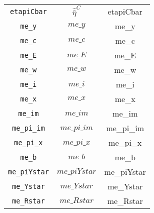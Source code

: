 \begin{center}
\begin{longtable}{ccc}
\texttt{etapiCbar} & $\hat{\bar{\eta}}^C$ & etapiCbar\\
\texttt{me\_y} & $me\_y$ & me\_y\\
\texttt{me\_c} & $me\_c$ & me\_c\\
\texttt{me\_E} & $me\_E$ & me\_E\\
\texttt{me\_w} & $me\_w$ & me\_w\\
\texttt{me\_i} & $me\_i$ & me\_i\\
\texttt{me\_x} & $me\_x$ & me\_x\\
\texttt{me\_im} & $me\_im$ & me\_im\\
\texttt{me\_pi\_im} & $me\_pi\_im$ & me\_pi\_im\\
\texttt{me\_pi\_x} & $me\_pi\_x$ & me\_pi\_x\\
\texttt{me\_b} & $me\_b$ & me\_b\\
\texttt{me\_piYstar} & $me\_piYstar$ & me\_piYstar\\
\texttt{me\_Ystar} & $me\_Ystar$ & me\_Ystar\\
\texttt{me\_Rstar} & $me\_Rstar$ & me\_Rstar\\
\hline%
\end{longtable}
\end{center}
